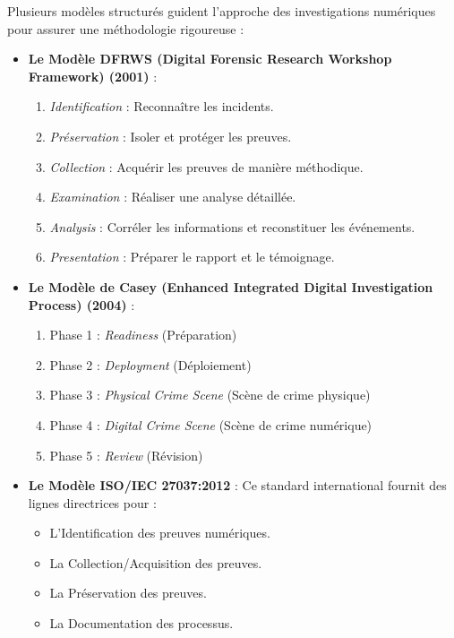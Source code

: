 \documentclass[12pt]{article}
\begin{document}
Plusieurs modèles structurés guident l'approche des investigations numériques pour assurer une méthodologie rigoureuse :

\begin{itemize}[leftmargin=*]
    \item \textbf{Le Modèle DFRWS (Digital Forensic Research Workshop Framework) (2001)} :
    \begin{enumerate}[leftmargin=*]
        \item \textit{Identification} : Reconnaître les incidents.
        \item \textit{Préservation} : Isoler et protéger les preuves.
        \item \textit{Collection} : Acquérir les preuves de manière méthodique.
        \item \textit{Examination} : Réaliser une analyse détaillée.
        \item \textit{Analysis} : Corréler les informations et reconstituer les événements.
        \item \textit{Presentation} : Préparer le rapport et le témoignage.
    \end{enumerate}

    \item \textbf{Le Modèle de Casey (Enhanced Integrated Digital Investigation Process) (2004)} :
    \begin{enumerate}[leftmargin=*]
        \item Phase 1 : \textit{Readiness} (Préparation)
        \item Phase 2 : \textit{Deployment} (Déploiement)
        \item Phase 3 : \textit{Physical Crime Scene} (Scène de crime physique)
        \item Phase 4 : \textit{Digital Crime Scene} (Scène de crime numérique)
        \item Phase 5 : \textit{Review} (Révision)
    \end{enumerate}

    \item \textbf{Le Modèle ISO/IEC 27037:2012} : Ce standard international fournit des lignes directrices pour :
    \begin{itemize}[leftmargin=*]
        \item L'Identification des preuves numériques.
        \item La Collection/Acquisition des preuves.
        \item La Préservation des preuves.
        \item La Documentation des processus.
    \end{itemize}
\end{itemize}
\end{document}

